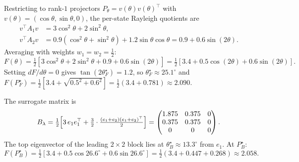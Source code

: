 \documentclass[final,3p,times]{elsarticle}
\begin{document}
Restricting to rank-$1$ projectors $P_\theta=v(\theta)v(\theta)^\top$
with $v(\theta)=(\cos\theta,\sin\theta,0)$, the per-state Rayleigh
quotients are
\begin{align*}
v^\top A_1 v &= 3\cos^2\theta+2\sin^2\theta,\\
v^\top A_2 v &= 0.9(\cos^2\theta+\sin^2\theta)+1.2\sin\theta\cos\theta
              =0.9+0.6\sin(2\theta).
\end{align*}
Averaging with weights $w_1=w_2=\tfrac{1}{2}$:
\begin{equation}
F(\theta)=\tfrac{1}{2}[3\cos^2\theta+2\sin^2\theta+0.9+0.6\sin(2\theta)]
=\tfrac{1}{2}[3.4+0.5\cos(2\theta)+0.6\sin(2\theta)].
\end{equation}
Setting $dF/d\theta=0$ gives $\tan(2\theta_F^\star)=1.2$, so
$\theta_F^\star\approx 25.1^\circ$ and
$F(P_F^\star)=\tfrac{1}{2}[3.4+\sqrt{0.5^2+0.6^2}]
=\tfrac{1}{2}(3.4+0.781)\approx 2.090$.

The surrogate matrix is
\begin{equation}
B_\lambda=\tfrac{1}{2}\Bigl[3\,e_1e_1^\top
+\tfrac{3}{2}\cdot\tfrac{(e_1+e_2)(e_1+e_2)^\top}{2}\Bigr]
=\begin{pmatrix} 1.875 & 0.375 & 0\\ 0.375 & 0.375 & 0\\ 0 & 0 & 0\end{pmatrix}.
\end{equation}
The top eigenvector of the leading $2\times 2$ block lies at
$\theta_B^\star\approx 13.3^\circ$ from $e_1$.
At $P_B^\star$:
\begin{equation}
F(P_B^\star)=\tfrac{1}{2}[3.4+0.5\cos 26.6^\circ+0.6\sin 26.6^\circ]
=\tfrac{1}{2}(3.4+0.447+0.268)\approx 2.058.
\end{equation}
\end{document}
